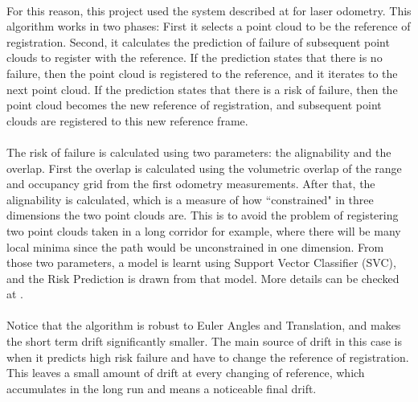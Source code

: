 \documentclass[12pt]{article}
\begin{document}
	\paragraph{}
	For this reason, this project used the system described at \cite{AICPAlign} for laser odometry. This algorithm works in two phases: First it selects a point cloud to be the reference of registration. Second, it calculates the prediction of failure of subsequent point clouds to register with the reference. If the prediction states that there is no failure, then the point cloud is registered to the reference, and it iterates to the next point cloud. If the prediction states that there is a risk of failure, then the point cloud becomes the new reference of registration, and subsequent point clouds are registered to this new reference frame.
	
	\paragraph{}
	The risk of failure is calculated using two parameters: the alignability and the overlap. First the overlap is calculated using the volumetric overlap of the range and occupancy grid from the first odometry measurements. After that, the alignability is calculated, which is a measure of how ``constrained" in three dimensions the two point clouds are. This is to avoid the problem of registering two point clouds taken in a long corridor for example, where there will be many local minima since the path would be unconstrained in one dimension. From those two parameters, a model is learnt using Support Vector Classifier (SVC), and the Risk Prediction is drawn from that model. More details can be checked at \cite{AICPAlign}.
	
	\paragraph{}
	Notice that the algorithm is robust to Euler Angles and Translation, and makes the short term drift significantly smaller. The main source of drift in this case is when it predicts high risk failure and have to change the reference of registration. This leaves a small amount of drift at every changing of reference, which accumulates in the long run and means a noticeable final drift.
	
\end{document}
